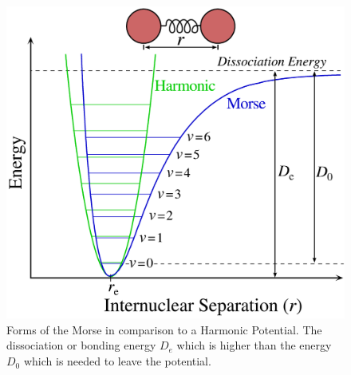 \begin{figure}[ht]
	\includegraphics[scale=0.1]{Bild/Morse-potential.png}
	\centering
	\caption[Potential Forms]{\small Forms of the Morse in comparison to a Harmonic Potential. The dissociation or bonding energy $D_e$ which is higher than the energy $D_0$ which is needed to leave the potential.\cite{Morse}}
	\label{figPotential}
\end{figure}
\newpage
